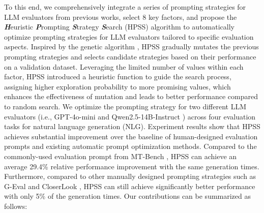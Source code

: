 To this end, we comprehensively integrate a series of prompting strategies for LLM evaluators from previous works, select 8 key factors, 
and propose the \textbf{\textit{H}}euristic \textbf{\textit{P}}rompting \textbf{\textit{S}}trategy \textbf{\textit{S}}earch (HPSS) algorithm to automatically optimize prompting strategies for LLM evaluators tailored to specific evaluation aspects.
Inspired by the genetic algorithm \cite{mitchell1980need}, 
HPSS gradually mutates the previous prompting strategies and selects candidate strategies based on their performance on a validation dataset. 
Leveraging the limited number of values within each factor,
HPSS introduced a heuristic function to guide the search process, assigning higher exploration probability to more promising values, which enhances the effectiveness of mutation and leads to better performance compared to random search. 
We optimize the prompting strategy for two different LLM evaluators (i.e., GPT-4o-mini \cite{openai2023gpt4} and Qwen2.5-14B-Instruct \cite{qwen2}) across four evaluation tasks for natural language generation (NLG). 
Experiment results show that HPSS achieves substantial improvement over the baseline of human-designed evaluation prompts and existing automatic prompt optimization methods. 
Compared to the commonly-used evaluation prompt from MT-Bench \cite{zheng2023judging}, HPSS can achieve an average 29.4\% relative performance improvement with the same generation times. 
Furthermore, compared to other manually designed prompting strategies such as G-Eval \cite{liu-etal-2023-g} and CloserLook \cite{chiang-lee-2023-closer}, HPSS can still achieve significantly better performance with only 5\% of the generation times. 
Our contributions can be summarized as follows:

